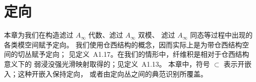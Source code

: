 
\chapter{定向}
\label{ch:08}

本章为我们在构造滤过 $A_\infty$ 代数、滤过 $A_\infty$ 双模、
滤过 $A_\infty$ 同态等过程中出现的各类模空间赋予定向。
我们使用仓西结构的概念，因而实际上是为带仓西结构空间的切丛赋予定向；
见定义~A1.17。在我们的情形中，纤维积是相对于仓西结构意义下的
弱浸没强光滑映射取得的；见定义~A1.13。
本章中，符号 $\subset$ 表示开嵌入；这种开嵌入保持定向，
或者由定向丛之间的典范识别所覆盖。


















